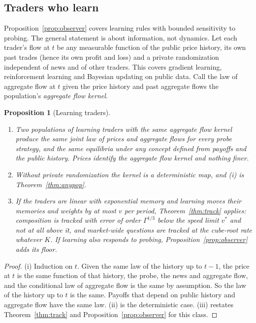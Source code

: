 \documentclass[12pt]{article}
\newtheorem{proposition}[theorem]{Proposition}
\theoremstyle{definition}
\theoremstyle{remark}
\begin{document}
\subsection{Traders who learn}

Proposition~\ref{prop:observer} covers learning rules with bounded sensitivity to probing. The general statement is about information, not dynamics. Let each trader's flow at $t$ be any measurable function of the public price history, its own past trades (hence its own profit and loss) and a private randomization independent of news and of other traders. This covers gradient learning, reinforcement learning and Bayesian updating on public data. Call the law of aggregate flow at $t$ given the price history and past aggregate flows the population's \emph{aggregate flow kernel}.

\begin{proposition}[Learning traders]\label{prop:learners}
\begin{enumerate}[label=(\roman*),itemsep=1pt]
\item Two populations of learning traders with the same aggregate flow kernel produce the same joint law of prices and aggregate flows for every probe strategy, and the same equilibria under any concept defined from payoffs and the public history. Prices identify the aggregate flow kernel and nothing finer.
\item Without private randomization the kernel is a deterministic map, and (i) is Theorem~\ref{thm:anypop}.
\item If the traders are linear with exponential memory and learning moves their memories and weights by at most $v$ per period, Theorem~\ref{thm:track} applies: composition is tracked with error of order $\Gamma^{1/3}$ below the speed limit $v^*$ and not at all above it, and market-wide questions are tracked at the cube-root rate whatever $K$. If learning also responds to probing, Proposition~\ref{prop:observer} adds its floor.
\end{enumerate}
\end{proposition}

\begin{proof}
(i) Induction on $t$. Given the same law of the history up to $t-1$, the price at $t$ is the same function of that history, the probe, the news and aggregate flow, and the conditional law of aggregate flow is the same by assumption. So the law of the history up to $t$ is the same. Payoffs that depend on public history and aggregate flow have the same law. (ii) is the deterministic case. (iii) restates Theorem~\ref{thm:track} and Proposition~\ref{prop:observer} for this class.
\end{proof}
\end{document}

